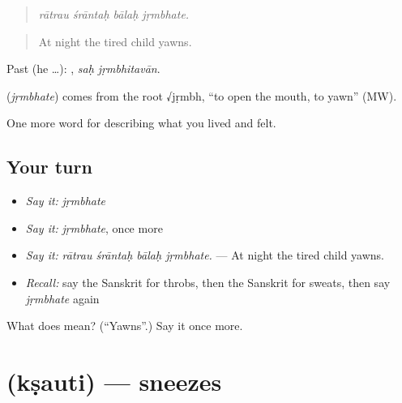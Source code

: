 \begin{quote}
   
\end{quote}

\begin{quote}
\emph{rātrau śrāntaḥ bālaḥ jṛmbhate.}
\end{quote}

\begin{quote}
At night the tired child yawns.
\end{quote}

Past (he …):  , \emph{saḥ jṛmbhitavān}.

\begin{cousinweb}
\textbf{} (\emph{jṛmbhate}) comes from the root √jṛmbh, \textquotedblleft{}to open the mouth, to yawn\textquotedblright{} (MW).
\end{cousinweb}

\begin{grammarlens}[title={What you've built}]
One more word for describing what you lived and felt.
\end{grammarlens}

\subsection*{Your turn}
\begin{itemize}
\raggedright
  \item \emph{Say it:} \emph{jṛmbhate}
  \item \emph{Say it:} \emph{jṛmbhate}, once more
  \item \emph{Say it:} \emph{rātrau śrāntaḥ bālaḥ jṛmbhate.} — At night the tired child yawns.
  \item \emph{Recall:} say the Sanskrit for throbs, then the Sanskrit for sweats, then say \emph{jṛmbhate} again
\end{itemize}

\begin{tcolorbox}[breakable,colback=teal!4,colframe=teal!35!black,title={Before you move on}]
What does  mean? (\textquotedblleft{}Yawns\textquotedblright{}.) Say it once more.
\end{tcolorbox}
\section[\texorpdfstring{\sk{क्षौति} (kṣauti)}{क्षौति (kṣauti)}]{ (kṣauti) — sneezes}

\label{lesson:SA-C475-ksauti}



